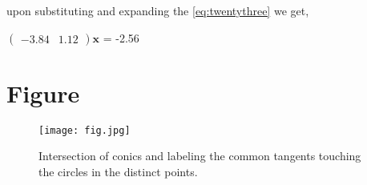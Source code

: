 \documentclass[journal,12pt,twocolumn]{IEEEtran}
\newcommand{\myvec}[1]{\ensuremath{\begin{pmatrix}#1\end{pmatrix}}}
\let\vec\mathbf
\begin{document}
upon substituting and expanding the \eqref{eq:twentythree} we get,
\begin{center}
$\myvec{-3.84 & 1.12}\vec{x}$ = -2.56 \\
\end{center}

\section{Figure}
\begin{figure}[h]
\texttt{[image: fig.jpg]}
\caption{Intersection of conics and labeling the common tangents touching the circles in the distinct points.}
		\label{fig:Figure}
\end{figure}
\end{document}
